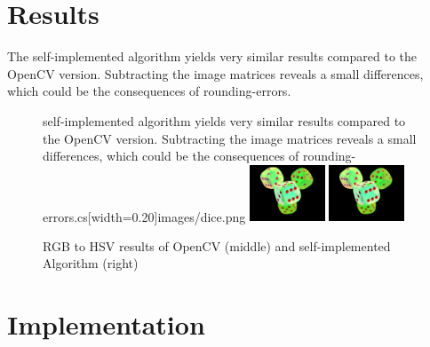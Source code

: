 \section{Results}

The self-implemented algorithm yields very similar results compared to the OpenCV version. Subtracting the image matrices reveals a small differences, which could be the consequences of rounding-errors.

\begin{figure}[H]
    \centering

     self-implemented algorithm yields very similar results compared to the OpenCV version. Subtracting the image matrices reveals a small differences, which could be the consequences of rounding-errors.cs[width=0.20\textwidth]{images/dice.png}
    \includegraphics[width=0.20\textwidth]{images/cv-hsv.png}
    \includegraphics[width=0.20\textwidth]{images/own-hsv.png}
    
    \caption{RGB to HSV results of OpenCV (middle) and self-implemented  Algorithm (right)}
    \label{fig:hsv}
\end{figure}

\section{Implementation}

